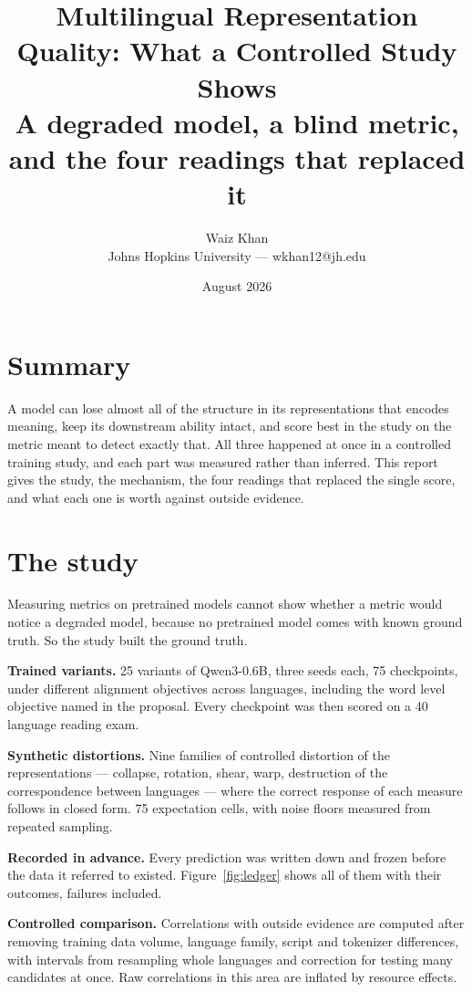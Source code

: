 \documentclass[10pt]{article}
\title{\vspace{-1.4em}\textbf{Multilingual Representation Quality:
What a Controlled Study Shows}\\[2pt]
\large A degraded model, a blind metric, and the four readings that
replaced it}
\author{Waiz Khan \\ \small Johns Hopkins University --- wkhan12@jh.edu}
\date{\small August 2026}
\begin{document}
\maketitle\vspace{-1.6em}

\section*{Summary}
A model can lose almost all of the structure in its representations
that encodes meaning, keep its downstream ability intact, and score
best in the study on the metric meant to detect exactly that. All three
happened at once in a controlled training study, and each part was
measured rather than inferred. This report gives the study, the
mechanism, the four readings that replaced the single score, and what
each one is worth against outside evidence.

\section{The study}
Measuring metrics on pretrained models cannot show whether a metric
would notice a degraded model, because no pretrained model comes with
known ground truth. So the study built the ground truth.

\textbf{Trained variants.} 25 variants of Qwen3-0.6B, three seeds each,
75 checkpoints, under different alignment objectives across languages,
including the word level objective named in the proposal. Every
checkpoint was then scored on a 40 language reading exam.

\textbf{Synthetic distortions.} Nine families of controlled distortion
of the representations --- collapse, rotation, shear, warp, destruction
of the correspondence between languages --- where the correct response
of each measure follows in closed form. 75 expectation cells, with
noise floors measured from repeated sampling.

\textbf{Recorded in advance.} Every prediction was written down and
frozen before the data it referred to existed. Figure~\ref{fig:ledger}
shows all of them with their outcomes, failures included.

\textbf{Controlled comparison.} Correlations with outside evidence are
computed after removing training data volume, language family, script
and tokenizer differences, with intervals from resampling whole
languages and correction for testing many candidates at once. Raw
correlations in this area are inflated by resource effects.
\end{document}
